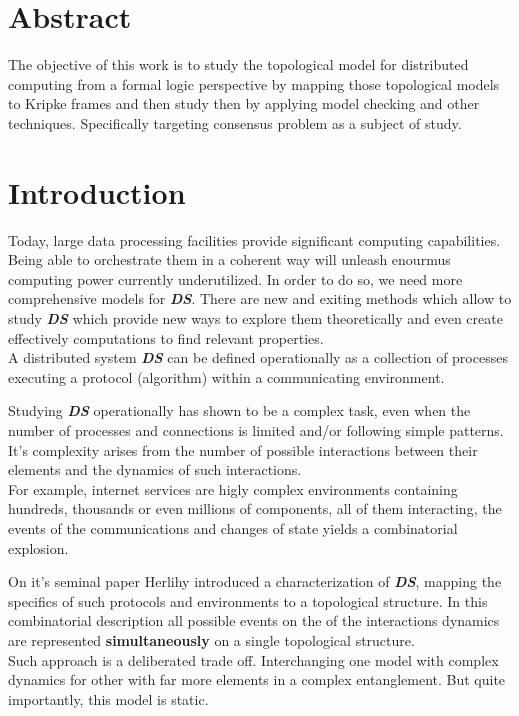 \documentclass[oneside,openany]{tufte-book} %
\newcommand{\ds}{\textbf{\textit{DS}}\xspace}
\begin{document}
\chapter{Abstract}


The objective of this work is to study the topological model for distributed computing from a formal logic perspective by mapping those topological models to Kripke frames and then study then by applying model checking and other techniques. Specifically targeting consensus problem as a subject of study.

\chapter{Introduction} 

Today, large data processing facilities provide significant computing capabilities. Being able to orchestrate them in a coherent way will unleash enourmus computing power currently underutilized. In order to do so, we need more comprehensive models for \ds. There are new and exiting methods which allow to study \ds which provide new ways to explore them theoretically and even create effectively computations to find relevant properties.\\

A distributed system \ds can be defined operationally as a collection of processes executing a protocol (algorithm) within a communicating environment.

Studying \ds operationally has shown to be a complex task, even when the number of processes and connections is limited and/or following simple patterns. 
It's complexity arises from the number of possible interactions between their 
elements and the dynamics of such interactions.\\

For example, internet services are higly complex environments containing hundreds, thousands or even millions of components, all of them interacting, the events of the communications and changes of state yields a combinatorial explosion.

On it's seminal paper \cite{Herlihy1999} Herlihy  introduced a characterization of \ds, 
mapping the specifics of such protocols and environments to a topological structure.
In this combinatorial description all possible events on the of the interactions dynamics  are represented {\bf simultaneously} on a single topological structure.\\
Such approach is a deliberated trade off. Interchanging one model with complex 
dynamics for other with far more elements in a complex entanglement. But quite importantly, this model is static.\\
\end{document}
